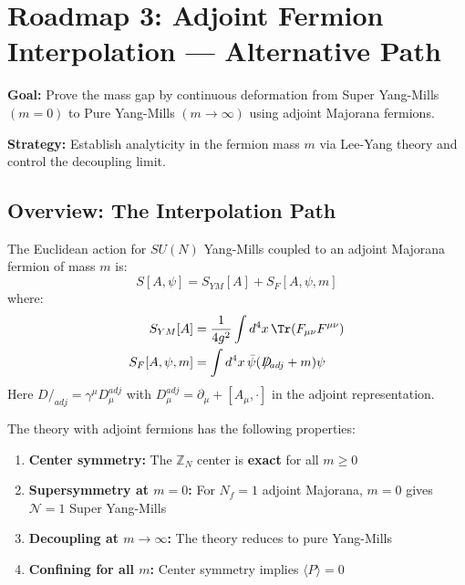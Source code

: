 \section{Roadmap 3: Adjoint Fermion Interpolation --- Alternative Path}
\label{sec:roadmap3-adjoint}

\textbf{Goal:} Prove the mass gap by continuous deformation from Super Yang-Mills 
$(m = 0)$ to Pure Yang-Mills $(m \to \infty)$ using adjoint Majorana fermions.

\textbf{Strategy:} Establish analyticity in the fermion mass $m$ via Lee-Yang 
theory and control the decoupling limit.

\subsection{Overview: The Interpolation Path}
\label{subsec:roadmap3-overview}

\begin{definition}
\label{def:adjoint-qcd-app90}
The Euclidean action for $SU(N)$ Yang-Mills coupled to an adjoint Majorana 
fermion of mass $m$ is:
\[
S[A, \psi] = S_{YM}[A] + S_F[A, \psi, m]
\]
where:
\begin{align}
S_{YM}[A] &= \frac{1}{4g^2} \int d^4x \, \Tr(F_{\mu\nu} F^{\mu\nu}) \\
S_F[A, \psi, m] &= \int d^4x \, \bar{\psi}(D\!\!\!\!/_{adj} + m)\psi
\end{align}
Here $D\!\!\!\!/_{adj} = \gamma^\mu D_\mu^{adj}$ with $D_\mu^{adj} = \partial_\mu + [A_\mu, \cdot]$ 
in the adjoint representation.
\end{definition}

\begin{proposition}
\label{prop:adjoint-properties}
The theory with adjoint fermions has the following properties:
\begin{enumerate}[label=(\roman*)]
\item \textbf{Center symmetry:} The $\mathbb{Z}_N$ center is \textbf{exact} for all $m \geq 0$
\item \textbf{Supersymmetry at $m = 0$:} For $N_f = 1$ adjoint Majorana, $m = 0$ 
      gives $\mathcal{N} = 1$ Super Yang-Mills
\item \textbf{Decoupling at $m \to \infty$:} The theory reduces to pure Yang-Mills
\item \textbf{Confining for all $m$:} Center symmetry implies $\langle P \rangle = 0$
\end{enumerate}
\end{proposition}

